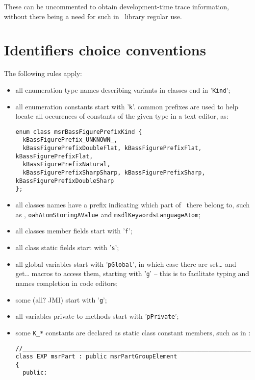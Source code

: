 These can be uncommented to obtain development-time trace information, without there being a need for such in \mf\ library regular use.


\section{Identifiers choice conventions}

The following rules apply:
\begin{itemize}

\item all enumeration type names describing variants in classes end in '{\tt Kind}';%
\item all enumeration constants start with '{\tt k}'. common prefixes are used to help locate all occurences of constants of the given type in a text editor, as:
\begin{lstlisting}[language=CPlusPlus]
enum class msrBassFigurePrefixKind {
  kBassFigurePrefix_UNKNOWN_,
  kBassFigurePrefixDoubleFlat, kBassFigurePrefixFlat, kBassFigurePrefixFlat,
  kBassFigurePrefixNatural,
  kBassFigurePrefixSharpSharp, kBassFigurePrefixSharp, kBassFigurePrefixDoubleSharp
};
\end{lstlisting}

\item all classes names have a prefix indicating which part of \mf\ there belong to, such as , {\tt oahAtomStoringAValue} and {\tt msdlKeywordsLanguageAtom};

\item all classes member fields start with '{\tt f}';

\item all class static fields start with '{\tt s}';

\item all global variables start with '{\tt pGlobal}', in which case there are {\code set\dots} and {\code get\dots} macros to access them, starting with '{\tt g}' -- this is to facilitate typing and names completion in code editors;
\item some (all? JMI) start with '{\tt g}';

\item all variables private to methods start with '{\tt pPrivate}';

\item some {\tt K_*} constants are declared as static class constant members, such as in :
\begin{lstlisting}[language=CPlusPlus]
//______________________________________________________________________________
class EXP msrPart : public msrPartGroupElement
{
  public:


\end{lstlisting}
\end{itemize}
